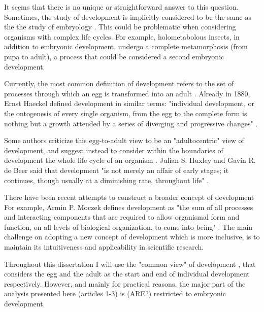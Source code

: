 It seems that there is no unique or straightforward answer to this question.
Sometimes, the study of development is implicitly considered to be the same as the the study of embryology \citep{Horder2010}.
This could be problematic when considering organisms with complex life cycles. For example, holometabolous insects, in addition to embryonic development, undergo a complete metamorphosis (from pupa to adult), a process that could be considered a second embryonic development.

Currently, the most common definition of development refers to the set of processes through which an egg is transformed into an adult \citep{Horder2010,Minelli2011}.
Already in 1880, Ernst Haeckel defined development in similar terms: "individual development, or the ontogenesis of every single organism, from the egg to the complete form is nothing but a growth attended by a series of diverging and progressive changes" \citep{haeckel_historycreation1880}.

Some authors criticize this egg-to-adult view to be an "adultocentric" view of development, and suggest instead to consider within the boundaries of development the whole life cycle of an organism \citep{Gilbert2011,Minelli2011}.
Julian S. Huxley and Gavin R. de Beer said that development "is not merely an affair of early stages; it continues, though usually at a diminishing rate, throughout life" \citep{huxley1963elements}.


There have been recent attempts to construct a broader concept of development \citep{Griesemer2014,Moczek2014,Pradeu2014} For example, Armin P. Moczek defines development as "the sum of all processes and interacting components that are required to allow organismal form and function, on all levels of biological organization, to come into being" \citep{Moczek2014}.
%
The main challenge on adopting a new concept of development which is more inclusive, is to maintain its intuitiveness and applicability in scientific research.

Throughout this dissertation I will use the "common view" of development \citep{Minelli2014}, that considers the egg and the adult as the start and end of individual development respectively.
However, and mainly for practical reasons, the major part of the analysis presented here (articles 1-3) is (ARE?) restricted to embryonic development.
